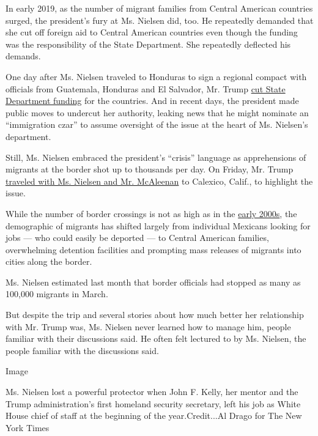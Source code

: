 In early 2019, as the number of migrant families from Central American
countries surged, the president's fury at Ms. Nielsen did, too. He
repeatedly demanded that she cut off foreign aid to Central American
countries even though the funding was the responsibility of the State
Department. She repeatedly deflected his demands.

One day after Ms. Nielsen traveled to Honduras to sign a regional
compact with officials from Guatemala, Honduras and El Salvador, Mr.
Trump
\href{https://www.nytimes3xbfgragh.onion/2019/03/29/us/politics/trump-mexico-illegal-immigration.html}{cut
State Department funding} for the countries. And in recent days, the
president made public moves to undercut her authority, leaking news that
he might nominate an ``immigration czar'' to assume oversight of the
issue at the heart of Ms. Nielsen's department.

Still, Ms. Nielsen embraced the president's ``crisis'' language as
apprehensions of migrants at the border shot up to thousands per day. On
Friday, Mr. Trump
\href{https://www.nytimes3xbfgragh.onion/2019/04/05/us/politics/trump-border-wall.html}{traveled
with Ms. Nielsen and Mr. McAleenan} to Calexico, Calif., to highlight
the issue.

While the number of border crossings is not as high as in the
\href{https://www.nytimes3xbfgragh.onion/2018/06/20/us/politics/fact-check-trump-border-crossings-declining-.html?module=inline}{early
2000s}, the demographic of migrants has shifted largely from individual
Mexicans looking for jobs --- who could easily be deported --- to
Central American families, overwhelming detention facilities and
prompting mass releases of migrants into cities along the border.

Ms. Nielsen estimated last month that border officials had stopped as
many as 100,000 migrants in March.

But despite the trip and several stories about how much better her
relationship with Mr. Trump was, Ms. Nielsen never learned how to manage
him, people familiar with their discussions said. He often felt lectured
to by Ms. Nielsen, the people familiar with the discussions said.

Image

Ms. Nielsen lost a powerful protector when John F. Kelly, her mentor and
the Trump administration's first homeland security secretary, left his
job as White House chief of staff at the beginning of the
year.Credit...Al Drago for The New York Times

